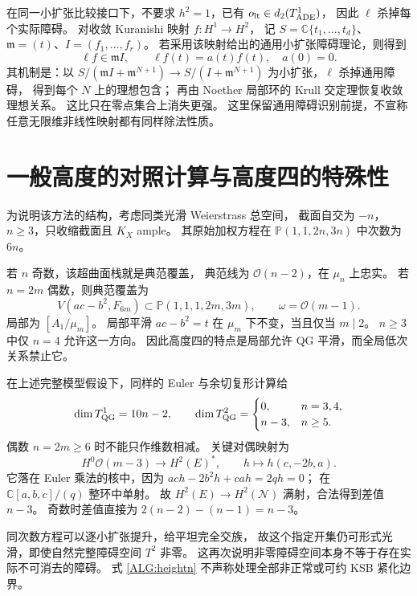 \documentclass[UTF8,fontset=fandol,zihao=-4,oneside,openany]{ctexbook}
\theoremstyle{cjkplain}
\numberwithin{equation}{chapter}
\begin{document}
在同一小扩张比较接口下，不要求 $h^2=1$，已有
$o_{\rm lt}\in d_2(T^1_{\rm ADE})$，
因此 $\ell$ 杀掉每个实际障碍。
对收敛 Kuranishi 映射 $f:H^1\to H^2$，
记 $S=\mathbb C\{t_1,\ldots,t_d\}$、$\mathfrak m=(t)$、$I=(f_1,\ldots,f_r)$。
若采用该映射给出的通用小扩张障碍理论，则得到
\begin{equation}
\ell f\in\mathfrak m I,\qquad
\ell f(t)=a(t)f(t),\quad a(0)=0.
\label{ALG:redundancy}
\end{equation}
其机制是：以
$S/(\mathfrak m I+\mathfrak m^{N+1})\to
S/(I+\mathfrak m^{N+1})$
为小扩张，$\ell$ 杀掉通用障碍，
得到每个 $N$ 上的理想包含；
再由 Noether 局部环的 Krull 交定理恢复收敛理想关系。
这比只在零点集合上消失更强。
这里保留通用障碍识别前提，不宣称任意无限维非线性映射都有同样除法性质。

\section{一般高度的对照计算与高度四的特殊性}

为说明该方法的结构，考虑同类光滑 Weierstrass 总空间，
截面自交为 $-n$，$n\ge3$，只收缩截面且 $K_X$ ample。
其原始加权方程在 $\mathbb P(1,1,2n,3n)$ 中次数为 $6n$。

若 $n$ 奇数，该超曲面栈就是典范覆盖，
典范线为 $\mathcal O(n-2)$，在 $\mu_n$ 上忠实。
若 $n=2m$ 偶数，则典范覆盖为
\[
V(ac-b^2,F_{6m})\subset\mathbb P(1,1,1,2m,3m),
\qquad \omega=\mathcal O(m-1).
\]
局部为 $[A_1/\mu_m]$。
局部平滑 $ac-b^2=t$ 在 $\mu_m$ 下不变，当且仅当 $m\mid2$。
$n\ge3$ 中仅 $n=4$ 允许这一方向。
因此高度四的特点是局部允许 QG 平滑，而全局低次关系禁止它。

在上述完整模型假设下，同样的 Euler 与余切复形计算给
\begin{equation}
\dim T^1_{\rm QG}=10n-2,\qquad
\dim T^2_{\rm QG}=
\begin{cases}
0,&n=3,4,\\
n-3,&n\ge5.
\end{cases}
\label{ALG:heightn}
\end{equation}
偶数 $n=2m\ge6$ 时不能只作维数相减。
关键对偶映射为
\[
H^0\mathcal O(m-3)\longrightarrow H^2(E)^*,\qquad
h\longmapsto h(c,-2b,a).
\]
它落在 Euler 乘法的核中，因为
$ach-2b^2h+cah=2qh=0$；
在 $\mathbb C[a,b,c]/(q)$ 整环中单射。
故 $H^2(E)\to H^2(\mathcal N)$ 满射，合法得到差值 $n-3$。
奇数时差值直接为 $2(n-2)-(n-1)=n-3$。

同次数方程可以逐小扩张提升，给平坦完全交族，
故这个指定开集仍可形式光滑，即使自然完整障碍空间 $T^2$ 非零。
这再次说明非零障碍空间本身不等于存在实际不可消去的障碍。
式 \eqref{ALG:heightn} 不声称处理全部非正常或可约 KSB 紧化边界。
\end{document}
